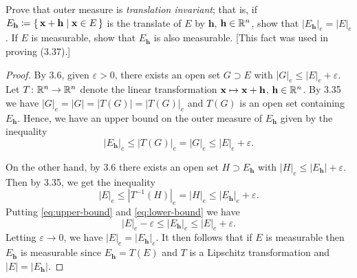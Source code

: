 \begin{problem}
Prove that outer measure is \emph{translation invariant}; that is, if
$E_{\textbf{h}}\coloneqq\left\{\,\mathbf{x}+\mathbf{h}\;\middle|\;\mathbf{x}\in
  E\,\right\}$ is the translate of $E$ by $\mathbf{h}$,
$\mathbf{h}\in\mathbb{R}^n$, show that
$\left|E_{\mathbf{h}}\right|_e=\left|E\right|_e$. If $E$ is measurable,
show that $E_{\mathbf{h}}$ is also measurable. [This fact was used in
proving (3.37).]
\end{problem}
\begin{proof}
By 3.6, given $\varepsilon>0$, there exists an open set $G\supset E$ with
$|G|_e\leq|E|_e+\varepsilon$. Let $T\colon\mathbb{R}^n\to\mathbb{R}^n$ denote the
linear transformation $\mathbf{x}\mapsto\mathbf{x}+\mathbf{h}$,
$\mathbf{h}\in\mathbb{R}^n$. By 3.35 we have $|G|_e=|G|=|T(G)|=|T(G)|_e$ and
$T(G)$ is an open set containing $E_{\mathbf{h}}$. Hence, we have an upper
bound on the outer measure of $E_{\mathbf{h}}$ given by the inequality
\begin{equation}
\label{eq:upper-bound}
\left|E_{\mathbf{h}}\right|_e\leq|T(G)|_e=|G|_e\leq |E|_e+\varepsilon.
\end{equation}

On the other hand, by 3.6 there exists an open set $H\supset
E_{\mathbf{h}}$ with
$|H|_e\leq\left|E_{\mathbf{h}}\right|+\varepsilon$. Then by 3.35, we get
the inequality
\begin{equation}
\label{eq:lower-bound}
|E|_e\leq\left|T^{-1}(H)\right|_e=|H|_e\leq\left|E_{\mathbf{h}}\right|_e+\varepsilon.
\end{equation}
Putting \eqref{eq:upper-bound} and \eqref{eq:lower-bound} we have
\[
|E|_e-\varepsilon\leq\left|E_{\mathbf{h}}\right|_e\leq|E|_e+\varepsilon.
\]
Letting $\varepsilon\to 0$, we have
$|E|_e=\left|E_{\mathbf{h}}\right|_e$. It then follows that if $E$ is
measurable then $E_{\mathbf{h}}$ is measurable since $E_{\mathbf{h}}=T(E)$
and $T$ is a Lipschitz transformation and
$|E|=\left|E_{\mathbf{h}}\right|$.
\end{proof}
\newpage

